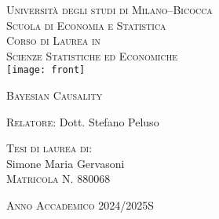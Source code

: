 

\pagestyle{empty} 

\begin{titlepage}
  
 \begin{center}
 {\large  

 \hfill

 \vfill
 {
 {\Large \textsc{Università degli studi di Milano--Bicocca}}\\
 {\textsc{Scuola di Economia e Statistica}}\\
 \vfill
	\textsc{Corso di Laurea  in} \\
	\textsc{Scienze Statistiche ed Economiche} \\
	\vfill
	\texttt{[image: front]}
 \vfill
 
 {\Huge\color{Maroon}\textsc{Bayesian Causality}}\\
 }
}
\end{center}

\vfill
{
\large
\begin{flushleft}
\textsc{Relatore}: Dott. Stefano Peluso \\
\end{flushleft}

\vfill
\begin{flushright}
\textsc{Tesi di laurea di}:\\
 Simone Maria Gervasoni\\
\textsc{Matricola N. 880068}
\end{flushright}

\vfill
\begin{center}
\textsc{Anno Accademico 2024/2025S}
\end{center}

}
\end{titlepage}
